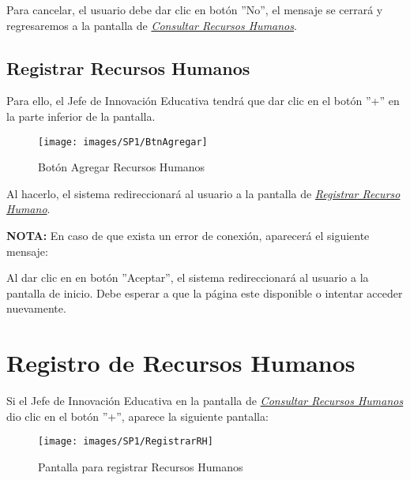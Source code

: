         	Para cancelar, el usuario debe dar clic en botón ''No'', el mensaje se cerrará y regresaremos a la pantalla de \hyperlink{consultarrh}{\textit{Consultar Recursos Humanos}}.\\

    	\subsection{Registrar Recursos Humanos}

        	Para ello, el Jefe de Innovación Educativa tendrá que dar clic en el botón ''+'' en la parte inferior de la pantalla.
        
        	\begin{figure}[!hbtp]
        		\centering
        		\hypertarget{add}{\texttt{[image: images/SP1/BtnAgregar]}}
        		\caption{Botón Agregar Recursos Humanos}
        		\label{add}
        	\end{figure}
        
        	Al hacerlo, el sistema redireccionará al usuario a la pantalla de \hyperlink{registrarrh}{\textit{Registrar Recurso Humano}}.
        
        
            \textbf{NOTA:} En caso de que exista un error de conexión, aparecerá el siguiente mensaje:
        
            Al dar clic en en botón ''Aceptar'', el sistema redireccionará al usuario a la pantalla de inicio. Debe esperar a que la página este disponible o intentar acceder nuevamente.
\newpage
    
    \section{Registro de Recursos Humanos}
        Si el Jefe de Innovación Educativa en la pantalla de \hyperlink{consultarrh}{\textit{Consultar Recursos Humanos}} dio clic en el botón ''+'', aparece la siguiente pantalla:

        \begin{figure}[!hbtp]
            \centering
            \hypertarget{registrarrh}{\texttt{[image: images/SP1/RegistrarRH]}}
            \caption{Pantalla para registrar Recursos Humanos}
            \label{registrarrh}
        \end{figure}
        
